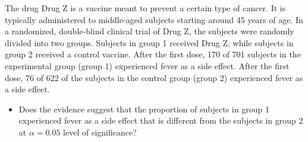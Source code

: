 \documentclass[11pt, chapterprefix=true]{scrbook}\usepackage[]{graphicx}\usepackage[]{color}
\begin{document}
\begin{exercises}
%   
\begin{exercise}   %

The drug Drug Z is a vaccine meant to prevent a certain type of cancer.  It is typically administered to middle-aged subjects starting around 45 years of age.  In a randomized, double-blind clinical trial of Drug Z,  the subjects were randomly divided into two groups.  Subjects in group 1 received Drug Z, while subjects in group 2 received a control vaccine.  After the first dose, 170 of 701 subjects in the experimental group (group 1) experienced fever as a side effect.  After the first dose, 76 of 622 of the subjects in the control group (group 2) experienced fever as a side effect.

\begin{itemize}
\item Does the evidence suggest that the proportion of subjects in group 1  experienced fever as a side effect that is different from the subjects in group 2 at $\alpha = 0.05$ level of significance?
 \end{itemize}
	  \vspace{5mm}


\end{exercise}
\end{exercises}
\end{document}
